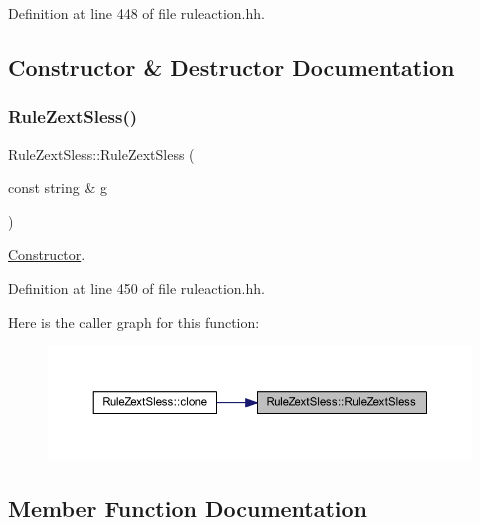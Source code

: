 Definition at line 448 of file ruleaction.\+hh.



\subsection{Constructor \& Destructor Documentation}
\mbox{\label{class_rule_zext_sless_a5b64efd401e4aca37f02540481464c89}} 
\subsubsection{\texorpdfstring{RuleZextSless()}{RuleZextSless()}}
{\footnotesize\ttfamily Rule\+Zext\+Sless\+::\+Rule\+Zext\+Sless (\begin{DoxyParamCaption}\item[{const string \&}]{g }\end{DoxyParamCaption})\hspace{0.3cm}{\ttfamily [inline]}}



\mbox{\hyperlink{class_constructor}{Constructor}}. 



Definition at line 450 of file ruleaction.\+hh.

Here is the caller graph for this function\+:
\nopagebreak
\begin{figure}[H]
\begin{center}
\leavevmode
\includegraphics[width=350pt]{class_rule_zext_sless_a5b64efd401e4aca37f02540481464c89_icgraph}
\end{center}
\end{figure}


\subsection{Member Function Documentation}
\mbox{\label{class_rule_zext_sless_ab27ad1b45b037db695c660850954f04e}} 
